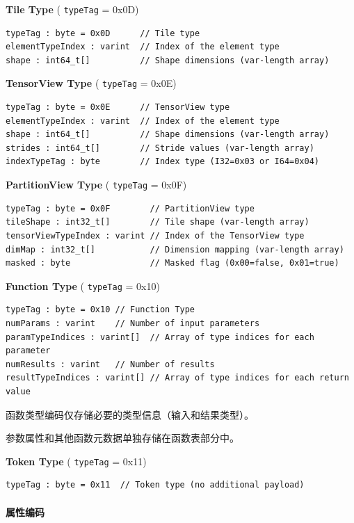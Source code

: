 \documentclass{article}
\begin{document}
\textbf{Tile Type} ( \texttt{typeTag} = 0x0D)


\begin{lstlisting}
typeTag : byte = 0x0D      // Tile type
elementTypeIndex : varint  // Index of the element type
shape : int64_t[]          // Shape dimensions (var-length array)
\end{lstlisting}

\textbf{TensorView Type} ( \texttt{typeTag} = 0x0E)


\begin{lstlisting}
typeTag : byte = 0x0E      // TensorView type
elementTypeIndex : varint  // Index of the element type
shape : int64_t[]          // Shape dimensions (var-length array)
strides : int64_t[]        // Stride values (var-length array)
indexTypeTag : byte        // Index type (I32=0x03 or I64=0x04)
\end{lstlisting}

\textbf{PartitionView Type} ( \texttt{typeTag} = 0x0F)


\begin{lstlisting}
typeTag : byte = 0x0F        // PartitionView type
tileShape : int32_t[]        // Tile shape (var-length array)
tensorViewTypeIndex : varint // Index of the TensorView type
dimMap : int32_t[]           // Dimension mapping (var-length array)
masked : byte                // Masked flag (0x00=false, 0x01=true)
\end{lstlisting}

\textbf{Function Type} ( \texttt{typeTag} = 0x10)


\begin{lstlisting}
typeTag : byte = 0x10 // Function Type
numParams : varint    // Number of input parameters
paramTypeIndices : varint[]  // Array of type indices for each parameter
numResults : varint   // Number of results
resultTypeIndices : varint[] // Array of type indices for each return value
\end{lstlisting}

函数类型编码仅存储必要的类型信息（输入和结果类型）。

参数属性和其他函数元数据单独存储在函数表部分中。


\textbf{Token Type} ( \texttt{typeTag} = 0x11)


\begin{lstlisting}
typeTag : byte = 0x11  // Token type (no additional payload)
\end{lstlisting}


\paragraph{属性编码}
\end{document}
